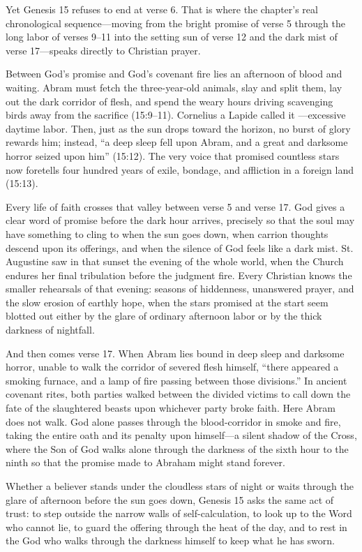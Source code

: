 Yet Genesis 15 refuses to end at verse 6. That is where the chapter's real chronological sequence---moving from the bright promise of verse 5 through the long labor of verses 9--11 into the setting sun of verse 12 and the dark mist of verse 17---speaks directly to Christian prayer.

Between God's promise and God's covenant fire lies an afternoon of blood and waiting. Abram must fetch the three-year-old animals, slay and split them, lay out the dark corridor of flesh, and spend the weary hours driving scavenging birds away from the sacrifice (15:9--11). Cornelius a Lapide called it ---excessive daytime labor. Then, just as the sun drops toward the horizon, no burst of glory rewards him; instead, ``a deep sleep fell upon Abram, and a great and darksome horror seized upon him'' (15:12). The very voice that promised countless stars now foretells four hundred years of exile, bondage, and affliction in a foreign land (15:13).

Every life of faith crosses that valley between verse 5 and verse 17. God gives a clear word of promise before the dark hour arrives, precisely so that the soul may have something to cling to when the sun goes down, when carrion thoughts descend upon its offerings, and when the silence of God feels like a dark mist. St. Augustine saw in that sunset the evening of the whole world, when the Church endures her final tribulation before the judgment fire. Every Christian knows the smaller rehearsals of that evening: seasons of hiddenness, unanswered prayer, and the slow erosion of earthly hope, when the stars promised at the start seem blotted out either by the glare of ordinary afternoon labor or by the thick darkness of nightfall.

And then comes verse 17. When Abram lies bound in deep sleep and darksome horror, unable to walk the corridor of severed flesh himself, ``there appeared a smoking furnace, and a lamp of fire passing between those divisions.'' In ancient covenant rites, both parties walked between the divided victims to call down the fate of the slaughtered beasts upon whichever party broke faith. Here Abram does not walk. God alone passes through the blood-corridor in smoke and fire, taking the entire oath and its penalty upon himself---a silent shadow of the Cross, where the Son of God walks alone through the darkness of the sixth hour to the ninth so that the promise made to Abraham might stand forever.

Whether a believer stands under the cloudless stars of night or waits through the glare of afternoon before the sun goes down, Genesis 15 asks the same act of trust: to step outside the narrow walls of self-calculation, to look up to the Word who cannot lie, to guard the offering through the heat of the day, and to rest in the God who walks through the darkness himself to keep what he has sworn.
